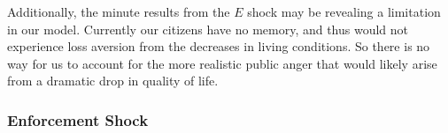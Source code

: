 \documentclass[12pt]{article}
\begin{document}
\begin{spacing}{1.5}
Additionally, the minute results from the $E$ shock may be revealing a limitation in our model. Currently our citizens have no memory, and thus would not experience loss aversion from the decreases in living conditions. So there is no way for us to account for the more realistic public anger that would likely arise from a dramatic drop in quality of life. 


\subsubsection{Enforcement Shock}

\begin{figure}
\centering
{} 

\end{figure}
\end{spacing}
\end{document}
